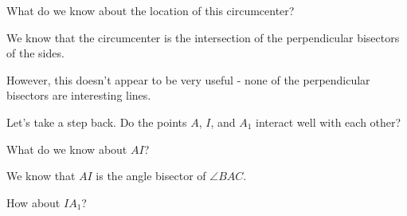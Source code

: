 What do we know about the location of this circumcenter?



We know that the circumcenter is the intersection of the perpendicular bisectors of the sides.

However, this doesn't appear to be very useful - none of the perpendicular bisectors are interesting lines.

Let's take a step back. Do the points $A$, $I$, and $A_1$ interact well with each other?

What do we know about $AI$?









We know that $AI$ is the angle bisector of $\angle BAC$.

How about $IA_1$?


